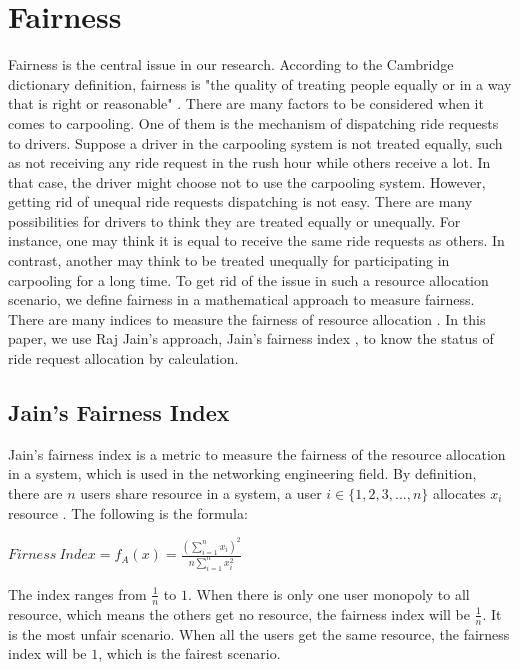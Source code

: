 \section{Fairness}

Fairness is the central issue in our research. According to the Cambridge dictionary definition, fairness is "the quality of treating people equally or in a way that is right or reasonable" \cite{noauthor_fairness_nodate}. There are many factors to be considered when it comes to carpooling. One of them is the mechanism of dispatching ride requests to drivers. Suppose a driver in the carpooling system is not treated equally, such as not receiving any ride request in the rush hour while others receive a lot. In that case, the driver might choose not to use the carpooling system. However, getting rid of unequal ride requests dispatching is not easy. There are many possibilities for drivers to think they are treated equally or unequally. For instance, one may think it is equal to receive the same ride requests as others. In contrast, another may think to be treated unequally for participating in carpooling for a long time. To get rid of the issue in such a resource allocation scenario, we define fairness in a mathematical approach to measure fairness. There are many indices to measure the fairness of resource allocation \cite{jain_99-0045_nodate}. In this paper, we use Raj Jain's approach, Jain's fairness index \cite{jain_quantitative_1998}, to know the status of ride request allocation by calculation.

\subsection{Jain's Fairness Index}

Jain's fairness index is a metric to measure the fairness of the resource allocation in a system, which is used in the networking engineering field. By definition, there are $n$ users share resource in a system, a user $i \in \{1,2,3,...,n\}$ allocates $x_i$ resource \cite{jain_quantitative_1998}. The following is the formula:

$Firness\ Index = f_A(x) = \frac{\left(\sum\limits_{i=1}^{n} x_i\right)^2}{n \sum\limits_{i=1}^{n} x_i^2}$

The index ranges from $\frac{1}{n}$ to $1$. When there is only one user monopoly to all resource, which means the others get no resource, the fairness index will be $\frac{1}{n}$. It is the most unfair scenario. When all the users get the same resource, the fairness index will be $1$, which is the fairest scenario.